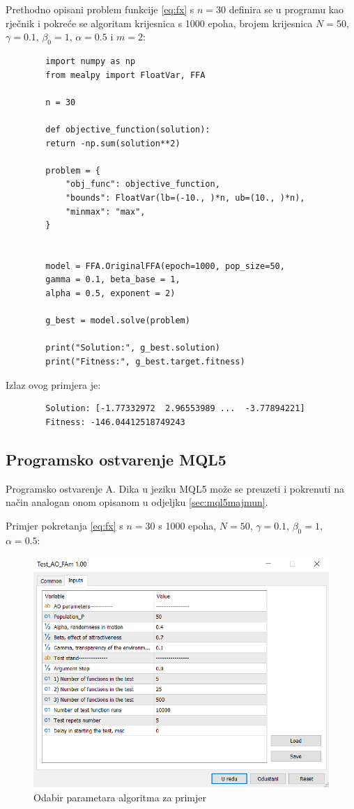 Prethodno opisani problem funkcije \eqref{eq:fx} s $n = 30$ definira se u programu kao rječnik i pokreće se algoritam krijesnica s 1000 epoha, brojem krijesnica $N = 50$,  $\gamma = 0.1$,  $\beta_0 = 1$, $\alpha = 0.5$ i $m = 2$:
\begin{framed}
	\begin{verbatim}
		import numpy as np
		from mealpy import FloatVar, FFA
		
		n = 30
		
		def objective_function(solution):
		return -np.sum(solution**2)
		
		problem = {
			"obj_func": objective_function,
			"bounds": FloatVar(lb=(-10., )*n, ub=(10., )*n),
			"minmax": "max",
		}
		
		
		model = FFA.OriginalFFA(epoch=1000, pop_size=50, 
		gamma = 0.1, beta_base = 1, 
		alpha = 0.5, exponent = 2)
		
		g_best = model.solve(problem)
		
		print("Solution:", g_best.solution)
		print("Fitness:", g_best.target.fitness)
	\end{verbatim}
\end{framed}


\noindent Izlaz ovog primjera je:
\begin{framed}
	\begin{verbatim}
		Solution: [-1.77332972  2.96553989 ...  -3.77894221]
		Fitness: -146.04412518749243
	\end{verbatim}
\end{framed}

\subsection{Programsko ostvarenje MQL5}
Programsko ostvarenje A. Dika u jeziku MQL5 može se preuzeti i pokrenuti na način analogan onom opisanom u odjeljku \ref{sec:mql5majmun}.

Primjer pokretanja \eqref{eq:fx} s $n = 30$ s 1000 epoha, $N = 50$,  $\gamma = 0.1$,  $\beta_0 = 1$, $\alpha = 0.5$:

\begin{figure}[H]
	\centering
	\includegraphics[width=14cm]{mt61}
	\caption{Odabir parametara algoritma za primjer}
	\centering
\end{figure}

